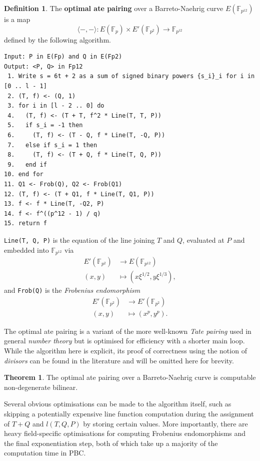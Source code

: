 \documentclass{article}
\theoremstyle{definition}
\newtheorem{definition}{Definition}
\newtheorem{theorem}{Theorem}
\newcommand{\F}{\mathbb{F}}
\begin{document}
\pagebreak

\begin{definition}
The \textbf{optimal ate pairing} over a Barreto-Naehrig curve $ E(\F_{p^{12}}) $ is a map
$$ \langle -, - \rangle : E(\F_p) \times E'(\F_{p^2}) \to \F_{p^{12}} $$
defined by the following algorithm.
\begin{verbatim}
Input: P in E(Fp) and Q in E(Fp2)
Output: <P, Q> in Fp12
 1. Write s = 6t + 2 as a sum of signed binary powers {s_i}_i for i in [0 .. l - 1]
 2. (T, f) <- (Q, 1)
 3. for i in [l - 2 .. 0] do
 4.   (T, f) <- (T + T, f^2 * Line(T, T, P))
 5.   if s_i = -1 then
 6.     (T, f) <- (T - Q, f * Line(T, -Q, P))
 7.   else if s_i = 1 then
 8.     (T, f) <- (T + Q, f * Line(T, Q, P))
 9.   end if
10. end for
11. Q1 <- Frob(Q), Q2 <- Frob(Q1)
12. (T, f) <- (T + Q1, f * Line(T, Q1, P))
13. f <- f * Line(T, -Q2, P)
14. f <- f^((p^12 - 1) / q)
15. return f
\end{verbatim}
\texttt{Line(T, Q, P)} is the equation of the line joining $ T $ and $ Q $, evaluated at $ P $ and embedded into $ \F_{p^{12}} $ via
\begin{align*}
E'(\F_{p^2}) & \longrightarrow E(\F_{p^{12}}) \\
(x, y) & \longmapsto (x\xi^{1 / 2}, y\xi^{1 / 3}),
\end{align*}
and \texttt{Frob(Q)} is the \emph{Frobenius endomorphism}
\begin{align*}
E'(\F_{p^2}) & \longrightarrow E'(\F_{p^2}) \\
(x, y) & \longmapsto (x^p, y^p).
\end{align*}
\end{definition}

The optimal ate pairing is a variant of the more well-known \emph{Tate pairing} used in general \emph{number theory} but is optimised for efficiency with a shorter main loop. While the algorithm here is explicit, its proof of correctness using the notion of \emph{divisors} can be found in the literature and will be omitted here for brevity.

\begin{theorem}
The optimal ate pairing over a Barreto-Naehrig curve is computable non-degenerate bilinear.
\end{theorem}

Several obvious optimisations can be made to the algorithm itself, such as skipping a potentially expensive line function computation during the assignment of $ T + Q $ and $ l(T, Q, P) $ by storing certain values. More importantly, there are heavy field-specific optimisations for computing Frobenius endomorphisms and the final exponentiation step, both of which take up a majority of the computation time in PBC.
\end{document}
